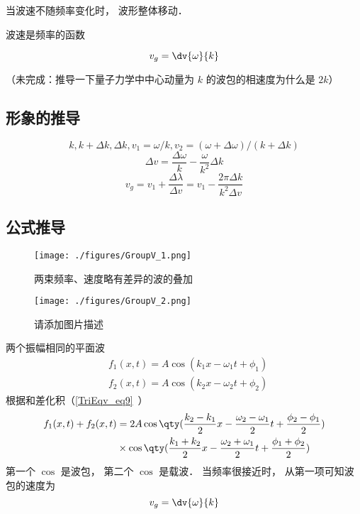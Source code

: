 
\begin{issues}
\issueDraft
\end{issues}


当波速不随频率变化时， 波形整体移动．

波速是频率的函数

\begin{equation}
v_g = \dv{\omega}{k}
\end{equation}

（未完成：推导一下量子力学中中心动量为 $k$ 的波包的相速度为什么是 $2k$）

\subsection{形象的推导}
\begin{equation}
k, k+\Delta k, \Delta k, v_1 = \omega/k, v_2 = (\omega+\Delta\omega)/(k+\Delta k)
\end{equation}
\begin{equation}
\Delta v = \frac{\Delta \omega}{k} - \frac{\omega}{k^2}\Delta k
\end{equation}
\begin{equation}
v_g = v_1 + \frac{\Delta \lambda}{\Delta v} = v_1 - \frac{2\pi\Delta k}{k^2\Delta v}
\end{equation}

\subsection{公式推导}
\begin{figure}[ht]
\centering
\texttt{[image: ./figures/GroupV\_1.png]}
\caption{两束频率、速度略有差异的波的叠加} \label{GroupV_fig1}
\end{figure}

\begin{figure}[ht]
\centering
\texttt{[image: ./figures/GroupV\_2.png]}
\caption{请添加图片描述} \label{GroupV_fig2}
\end{figure}
两个振幅相同的平面波
\begin{equation}
\begin{aligned}
&f_1(x,t) = A\cos(k_1 x - \omega_1 t + \phi_1)\\
&f_2(x,t) = A\cos(k_2 x - \omega_2 t + \phi_2)
\end{aligned}
\end{equation}
根据和差化积（\autoref{TriEqv_eq9}~）
\begin{equation}
\begin{aligned}
f_1(x,t) + f_2(x,t) &= 2 A \cos \qty(\frac{k_2-k_1}{2}x - \frac{\omega_2-\omega_1}{2}t + \frac{\phi_2 - \phi_1}{2})\\
& \times \cos \qty(\frac{k_1+k_2}{2}x - \frac{\omega_{2}+\omega_{1}}{2}t + \frac{\phi_1 + \phi_2}{2})
\end{aligned}
\end{equation}
第一个 $\cos$ 是波包， 第二个 $\cos$ 是载波． 当频率很接近时， 从第一项可知波包的速度为
\begin{equation}
v_g = \dv{\omega}{k}
\end{equation}
